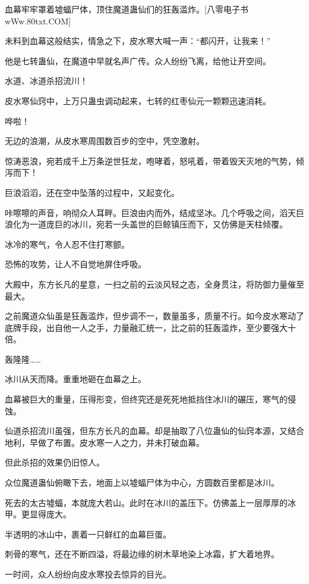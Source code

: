 
\begin{this_body}

血幕牢牢罩着墟蝠尸体，顶住魔道蛊仙们的狂轰滥炸。[八零电子书wWw.80txt.COM]

未料到血幕这般结实，情急之下，皮水寒大喊一声：“都闪开，让我来！”

他是七转蛊仙，在魔道中早就名声广传。众人纷纷飞离，给他让开空间。

水道、冰道杀招流川！

皮水寒仙窍中，上万只蛊虫调动起来，七转的红枣仙元一颗颗迅速消耗。

哗啦！

无边的浪潮，从皮水寒周围数百步的空中，凭空激射。

惊涛恶浪，宛若成千上万条逆世狂龙，咆哮着，怒吼着，带着毁天灭地的气势，倾泻而下！

巨浪滔滔，还在空中坠落的过程中，又起变化。

咔嚓嚓的声音，响彻众人耳畔。巨浪由内而外，结成坚冰。几个呼吸之间，滔天巨浪化为一道庞巨的冰川，宛若一头盖世的巨鲸镇压而下，又仿佛是天柱倾覆。

冰冷的寒气，令人忍不住打寒颤。

恐怖的攻势，让人不自觉地屏住呼吸。

大殿中，东方长凡的星意，一扫之前的云淡风轻之态，全身贯注，将防御力量催至最大。

之前魔道众仙虽是狂轰滥炸，但步调不一，数量虽多，质量不行。如今皮水寒动了底牌手段，出自他一人之手，力量融汇统一，比之前的狂轰滥炸，至少要强大十倍。

轰隆隆……

冰川从天而降。重重地砸在血幕之上。

血幕被巨大的重量，压得形变，但终究还是死死地抵挡住冰川的碾压，寒气的侵蚀。

仙道杀招流川虽强，但东方长凡的血幕。却是抽取了八位蛊仙的仙窍本源，又结合地利，早做了布置。皮水寒一人之力，并未打破血幕。

但此杀招的效果仍旧惊人。

众位魔道蛊仙俯瞰下去，地面上以墟蝠尸体为中心，方圆数百里都是冰川。

死去的太古墟蝠，本就庞大若山。此时在冰川的盖压下。仿佛盖上一层厚厚的冰甲。更显得庞大。

半透明的冰山中，裹着一只鲜红的血幕巨蛋。

刺骨的寒气，还在不断四溢，将最边缘的树木草地染上冰霜，扩大着地界。

一时间，众人纷纷向皮水寒投去惊异的目光。


\end{this_body}
